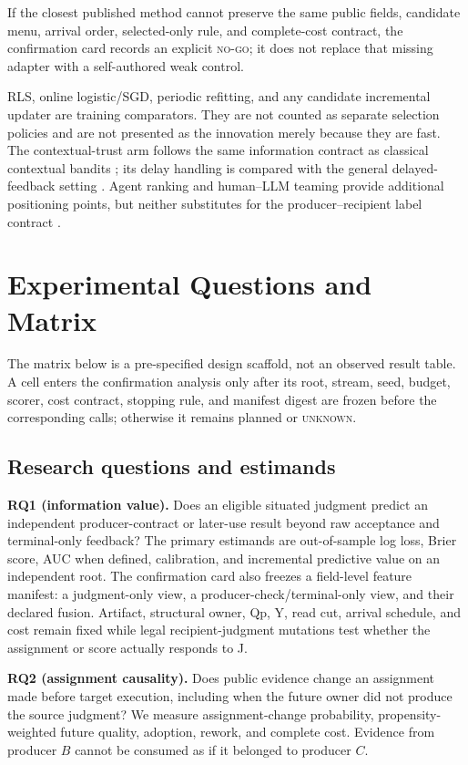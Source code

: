 \documentclass[sigconf,anonymous]{aamas}
\newcommand{\unknown}{\textsc{unknown}}
\begin{document}
If the closest published method cannot preserve the same public fields, candidate menu,
arrival order, selected-only rule, and complete-cost contract, the confirmation card records
an explicit \textsc{no-go}; it does not replace that missing adapter with a self-authored
weak control.

RLS, online logistic/SGD, periodic refitting, and any candidate incremental updater are training comparators. They are not counted as separate selection policies and are not presented as the innovation merely because they are fast. The contextual-trust arm follows the same information contract as classical contextual bandits \cite{li2010contextual}; its delay handling is compared with the general delayed-feedback setting \cite{joulani2013delayed}. Agent ranking and human--LLM teaming provide additional positioning points, but neither substitutes for the producer--recipient label contract \cite{lanctot2025soft,yurrita2026guidelines}.

\section{Experimental Questions and Matrix}
\label{sec:experiments}

The matrix below is a pre-specified design scaffold, not an observed result table. A cell enters
the confirmation analysis only after its root, stream, seed, budget, scorer, cost contract,
stopping rule, and manifest digest are frozen before the corresponding calls; otherwise it
remains planned or \unknown{}.

\subsection{Research questions and estimands}
\textbf{RQ1 (information value).} Does an eligible situated judgment predict an independent producer-contract or later-use result beyond raw acceptance and terminal-only feedback? The primary estimands are out-of-sample log loss, Brier score, AUC when defined, calibration, and incremental predictive value on an independent root. The confirmation card also freezes a field-level feature manifest: a judgment-only view, a producer-check/terminal-only view, and their declared fusion. Artifact, structural owner, Qp, Y, read cut, arrival schedule, and cost remain fixed while legal recipient-judgment mutations test whether the assignment or score actually responds to J.

\textbf{RQ2 (assignment causality).} Does public evidence change an assignment made before target execution, including when the future owner did not produce the source judgment? We measure assignment-change probability, propensity-weighted future quality, adoption, rework, and complete cost. Evidence from producer $B$ cannot be consumed as if it belonged to producer $C$.
\end{document}
